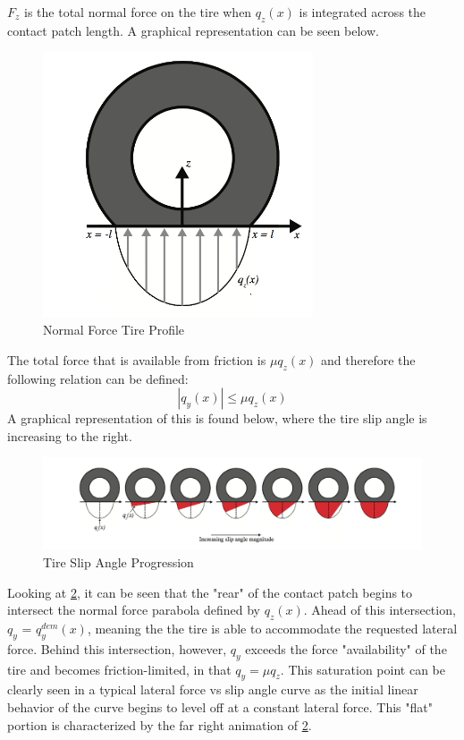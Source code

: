 \documentclass{article}
\numberwithin{equation}{section}
\begin{document}
$F_z$ is the total normal force on the tire when $q_z(x)$ is integrated across the contact patch length. A graphical representation can be seen below.
\begin{figure}[H]
\centering
\includegraphics[width=8cm]{NormalTireProfile.png}
\caption{Normal Force Tire Profile}
\label{fig:NormalTireProfile}
\end{figure}
The total force that is available from friction is $\mu q_z(x)$ and therefore the following relation can be defined:
\begin{equation}\label{eq2.13}
    |q_y(x)|\leq\mu q_z(x)
\end{equation}
A graphical representation of this is found below, where the tire slip angle is increasing to the right.
\begin{figure}[H]
\centering
\includegraphics[width=12cm]{IncreasingSlip.png}
\caption{Tire Slip Angle Progression}
\label{fig:IncreasingSlip}
\end{figure}
Looking at \ref{fig:IncreasingSlip}, it can be seen that the "rear" of the contact patch begins to intersect the normal force parabola defined by $q_z(x)$. Ahead of this intersection, $q_y$ = $q_y^{dem}(x)$, meaning the the tire is able to accommodate the requested lateral force. Behind this intersection, however, $q_y$ exceeds the force "availability" of the tire and becomes friction-limited, in that $q_y = \mu q_z$. This saturation point can be clearly seen in a typical lateral force vs slip angle curve as the initial linear behavior of the curve begins to level off at a constant lateral force. This "flat" portion is characterized by the far right animation of \ref{fig:IncreasingSlip}. 
\end{document}
